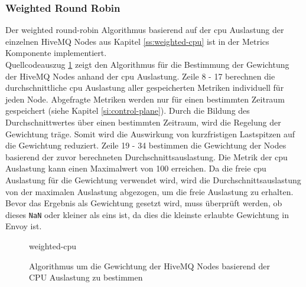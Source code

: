 \subsubsection{Weighted Round Robin}
Der weighted round-robin Algorithmus basierend auf der \ac{cpu} Auslastung der einzelnen HiveMQ Nodes aus Kapitel \ref{ss:weighted-cpu} ist in der Metrics Komponente implementiert.
\\
Quellcodeauszug \ref{code:weighted-cpu} zeigt den Algorithmus für die Bestimmung der Gewichtung der HiveMQ Nodes anhand der \ac{cpu} Auslastung.
Zeile 8 - 17 berechnen die durchschnittliche \ac{cpu} Auslastung aller gespeicherten Metriken individuell für jeden Node. Abgefragte Metriken werden nur für einen bestimmten Zeitraum gespeichert (siehe Kapitel \ref{si:control-plane}). Durch die Bildung des Durchschnittwertes über einen bestimmten Zeitraum, wird die Regelung der Gewichtung träge. Somit wird die Auswirkung von kurzfristigen Lastspitzen auf die Gewichtung reduziert.
Zeile 19 - 34 bestimmen die Gewichtung der Nodes basierend der zuvor berechneten Durchschnittsauslastung. Die Metrik der \ac{cpu} Auslastung kann einen Maximalwert von 100 erreichen. Da die freie \ac{cpu} Auslastung für die Gewichtung verwendet wird, wird die Durchschnittsauslastung von der maximalen Auslastung abgezogen, um die freie Auslastung zu erhalten. Bevor das Ergebnis als Gewichtung gesetzt wird, muss überprüft werden, ob dieses \verb|NaN| oder kleiner als eins ist, da dies die kleinste erlaubte Gewichtung in Envoy ist.
\begin{figure}
    {weighted-cpu}
    \caption{Algorithmus um die Gewichtung der HiveMQ Nodes basierend der CPU Auslastung zu bestimmen}
    \label{code:weighted-cpu}
\end{figure}

